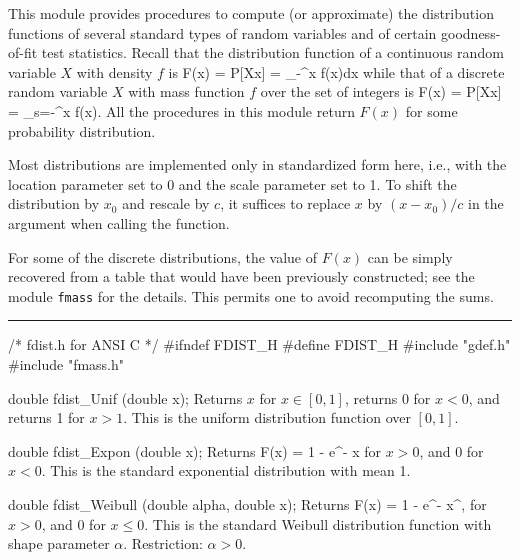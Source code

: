 
This module provides procedures to compute (or approximate)
the distribution functions of several standard types of random variables
and of certain goodness-of-fit test statistics.
Recall that the distribution function of a continuous random variable $X$ 
with density $f$ is
\eq
  F(x) = P[X\le x] = \int_{-\infty}^x f(x)dx 
\endeq
while that of a discrete random variable $X$ with mass function $f$ 
over the set of integers is
\eq
  F(x) = P[X\le x] = \sum_{s=-\infty}^x f(x).
\endeq
All the procedures in this module return $F(x)$ for some 
probability distribution.

Most distributions are implemented only in standardized form here,
i.e., with the location parameter set to 0 and the scale parameter
set to 1.  To shift the distribution by $x_0$ and rescale by $c$, 
it suffices to replace $x$ by $(x-x_0)/c$ in the argument when 
calling the function.

 For some of the discrete distributions, the value of $F(x)$ can be
 simply recovered from a table that would have been previously
 constructed; see the module {\tt fmass} for the details.
 This permits one to avoid recomputing the sums.


\bigskip\hrule\medskip
\code\hide
/* fdist.h for ANSI C */
#ifndef FDIST_H
#define FDIST_H
\endhide
#include "gdef.h"
#include "fmass.h"
\endcode


\code

double fdist_Unif (double x);
\endcode
  \tab
  Returns $x$ for $x \in [0, 1]$, returns 0 for $x < 0$, and returns 1
  for $x > 1$. This is the uniform distribution function over $[0, 1]$.
 \endtab
\code


double fdist_Expon (double x);
\endcode
 \tab
  Returns 
  \eq
   F(x) = 1 - e^{- x}                          
  \endeq
  for $x > 0$, and 0 for $x<0$.  This is the standard exponential 
  distribution \cite{tJOH95a} with mean 1.
 \endtab
\code


double fdist_Weibull (double alpha, double x);
\endcode
  \tab
  Returns 
  \eq
   F(x) = 1 - e^{- x^\alpha},                 
  \endeq
  for $x>0$, and 0 for $x\le 0$.
  This is the standard Weibull distribution function \cite{tJOH95a} with shape 
  parameter $\alpha$.
  Restriction: $\alpha > 0$.
 \endtab
\code


